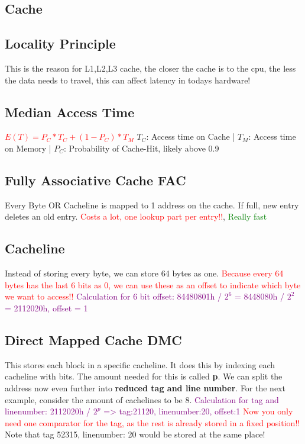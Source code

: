 \documentclass[main.tex,fontsize=8pt,paper=a4,paper=landscape,DIV=calc,]{scrartcl}
\begin{document}
\begin{multicols*}{4}
\section{Cache}

\subsection{Locality Principle}
This is the reason for L1,L2,L3 cache, the closer the cache is to the cpu, the less the data needs to travel, this can affect latency in todays hardware!

\subsection{Median Access Time}
\textcolor{red}{\(E(T) = P_C * T_C + (1 - P_C )* T_M\)}\newline
\(T_C\): Access time on Cache |
\(T_M\): Access time on Memory |
\(P_C\): Probability of Cache-Hit, likely above 0.9

\subsection{Fully Associative Cache FAC}
Every Byte OR Cacheline is mapped to 1 address on the cache. If full, new entry deletes an old entry.
\textcolor{red}{Costs a lot, one lookup part per entry!!}, \textcolor{green}{Really fast}

\subsection{Cacheline}
Instead of storing every byte, we can store 64 bytes as one. \textcolor{red}{Because every 64 bytes has the last 6 bits as 0, we can use these as an offset to indicate which byte we want to access!!}
\textcolor{purple}{Calculation for 6 bit offset: 84480801h / \(2^6\) = 8448080h / \(2^2\) = 2112020h, offset = 1 }

\subsection{Direct Mapped Cache DMC}
This stores each block in a specific cacheline. 
It does this by indexing each cacheline with bits. The amount needed for this is called \textbf{p}. 
We can split the address now even further into \textbf{reduced tag and line number}.
For the next example, consider the amount of cachelines to be 8.
\textcolor{purple}{Calculation for tag and linenumber: 2112020h / \(2^p\) => tag:21120, linenumber:20, offset:1}
\textcolor{red}{Now you only need one comparator for the tag, as the rest is already stored in a fixed position!!}\newline
\textcolor{OliveGreen}{Note that tag 52315, linenumber: 20 would be stored at the same place!}


\end{multicols*}
\end{document}
